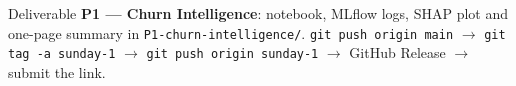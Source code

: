 \documentclass[11pt,a4paper]{article}
\begin{document}
\begin{submitbox}
Deliverable \textbf{P1 --- Churn Intelligence}: notebook, MLflow logs, SHAP plot and one-page summary in \texttt{P1-churn-intelligence/}.
\texttt{git push origin main} $\rightarrow$ \texttt{git tag -a sunday-1} $\rightarrow$ \texttt{git push origin sunday-1} $\rightarrow$ GitHub Release $\rightarrow$ submit the link.
\end{submitbox}


\end{document}
